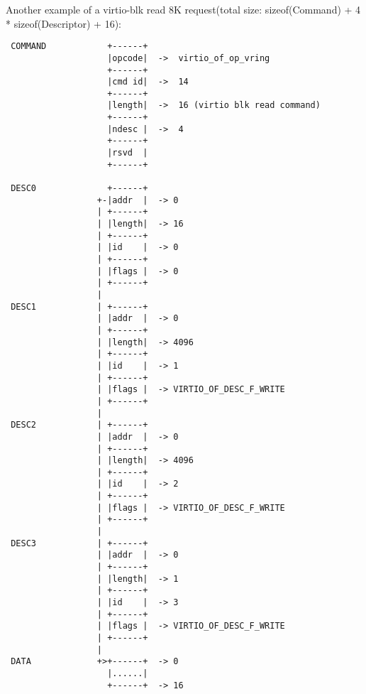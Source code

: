 Another example of a virtio-blk read 8K request(total size: sizeof(Command) +
4 * sizeof(Descriptor) + 16):
\begin{lstlisting}
 COMMAND            +------+
                    |opcode|  ->  virtio_of_op_vring
                    +------+
                    |cmd id|  ->  14
                    +------+
                    |length|  ->  16 (virtio blk read command)
                    +------+
                    |ndesc |  ->  4
                    +------+
                    |rsvd  |
                    +------+

 DESC0              +------+
                  +-|addr  |  -> 0
                  | +------+
                  | |length|  -> 16
                  | +------+
                  | |id    |  -> 0
                  | +------+
                  | |flags |  -> 0
                  | +------+
                  |
 DESC1            | +------+
                  | |addr  |  -> 0
                  | +------+
                  | |length|  -> 4096
                  | +------+
                  | |id    |  -> 1
                  | +------+
                  | |flags |  -> VIRTIO_OF_DESC_F_WRITE
                  | +------+
                  |
 DESC2            | +------+
                  | |addr  |  -> 0
                  | +------+
                  | |length|  -> 4096
                  | +------+
                  | |id    |  -> 2
                  | +------+
                  | |flags |  -> VIRTIO_OF_DESC_F_WRITE
                  | +------+
                  |
 DESC3            | +------+
                  | |addr  |  -> 0
                  | +------+
                  | |length|  -> 1
                  | +------+
                  | |id    |  -> 3
                  | +------+
                  | |flags |  -> VIRTIO_OF_DESC_F_WRITE
                  | +------+
                  |
 DATA             +>+------+  -> 0
                    |......|
                    +------+  -> 16
\end{lstlisting}

